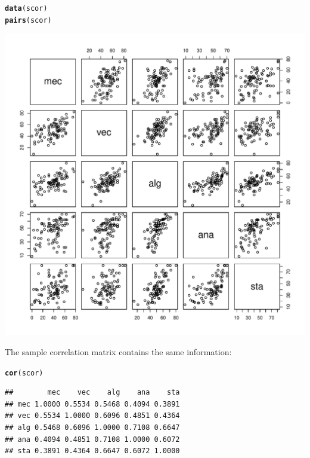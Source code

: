 \documentclass{article}\usepackage[]{graphicx}\usepackage[]{color}
\makeatletter
\def\maxwidth{ %
  \ifdim\Gin@nat@width>\linewidth
    \linewidth
  \else
    \Gin@nat@width
  \fi
}
\newcommand{\hlkwd}[1]{\textcolor[rgb]{0.737,0.353,0.396}{\textbf{#1}}}%
\newenvironment{kframe}{%
 \def\at@end@of@kframe{}%
 \ifinner\ifhmode%
  \def\at@end@of@kframe{\end{minipage}}%
  \begin{minipage}{\columnwidth}%
 \fi\fi%
 \def\FrameCommand##1{\hskip\@totalleftmargin \hskip-\fboxsep
 \colorbox{shadecolor}{##1}\hskip-\fboxsep
     \hskip-\linewidth \hskip-\@totalleftmargin \hskip\columnwidth}%
 \MakeFramed {\advance\hsize-\width
   \@totalleftmargin\z@ \linewidth\hsize
   \@setminipage}}%
 {\par\unskip\endMakeFramed%
 \at@end@of@kframe}
\newenvironment{knitrout}{}{} %
\makeatother
\begin{document}
\begin{itemize}
\begin{knitrout}
\color{fgcolor}\begin{kframe}
\begin{alltt}
\hlkwd{data}(scor)
\hlkwd{pairs}(scor)
\end{alltt}
\end{kframe}
\includegraphics[width=\maxwidth]{figure/seven6} 

\end{knitrout}


The sample correlation matrix contains the same information:\\
\begin{knitrout}
\color{fgcolor}\begin{kframe}
\begin{alltt}
\hlkwd{cor}(scor)
\end{alltt}
\begin{verbatim}
##        mec    vec    alg    ana    sta
## mec 1.0000 0.5534 0.5468 0.4094 0.3891
## vec 0.5534 1.0000 0.6096 0.4851 0.4364
## alg 0.5468 0.6096 1.0000 0.7108 0.6647
## ana 0.4094 0.4851 0.7108 1.0000 0.6072
## sta 0.3891 0.4364 0.6647 0.6072 1.0000
\end{verbatim}
\end{kframe}
\end{knitrout}


\end{itemize}
\end{document}
